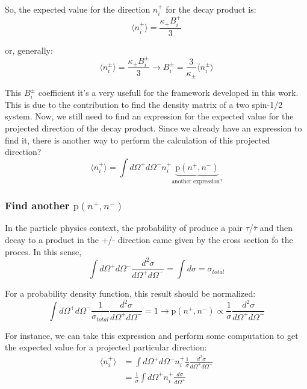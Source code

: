 \documentclass[onecolumn, amsmath, amssymb, aps, prd]{revtex4-2}
\begin{document}
			So, the expected value for the direction $n_i^+$ for the decay product is:
			\begin{equation}
				\langle n_i^+ \rangle = \frac{\kappa_+ B_i^+}{3}
			\end{equation}

			or, generally:
			\begin{equation} \label{eq1}
				\langle n_i^{\pm} \rangle = \frac{\kappa_{\pm} B_i^{\pm}}{3} \rightarrow B_i^{\pm} = \frac{3}{\kappa_{\pm}} \langle n_i^{\pm} \rangle
			\end{equation}

			This $B_i^{\pm}$ coefficient it's a very usefull for the framework developed in this work. This is due to the contribution to find the density matrix of a two spin-1/2 system. Now, we still need to find an expression for the expected value for the projected direction of the decay product. Since we already have an expression to find it, there is another way to perform the calculation of this projected direction?
			\begin{equation}
				\langle n_i^+ \rangle = \int d\Omega^+ d\Omega^- n_i^+ \underbrace{\text{p}(n^+, n^-)}_{\text{another expression?}}
			\end{equation}

		\subsubsection{Find another $\text{p}(n^+, n^-)$}
			In the particle physics context, the probability of produce a pair $\tau$/$\overline{\tau}$ and then decay to a product in the +/- direction came given by the cross section fo the proces. In this sense,
			\begin{equation}
				\int d\Omega^+ d\Omega^- \frac{d^2\sigma}{d\Omega^+ d\Omega^-} = \int d\sigma = \sigma_{total}
			\end{equation}

			For a probability density function, this result should be normalized:
			\begin{equation} \label{eq2}
				\int d\Omega^+ d\Omega^- \frac{1}{\sigma_{total}} \frac{d^2\sigma}{d\Omega^+ d\Omega^-} = 1 \rightarrow \text{p}(n^+, n^-) \propto \frac{1}{\sigma} \frac{d^2\sigma}{d\Omega^+ d\Omega^-}
			\end{equation}

			For instance, we can take this expression and perform some computation to get the expected value for a projected particular direction:
			\begin{equation}
				\begin{split}
					\langle n_i^+ \rangle & = \int d\Omega^+ d\Omega^- n_i^+ \frac{1}{\sigma} \frac{d^2\sigma}{d\Omega^+ d\Omega^-} \\
					& = \frac{1}{\sigma} \int d\Omega^+ n_i^+ \frac{d\sigma}{d\Omega^+}
				\end{split}
			\end{equation}
\end{document}
